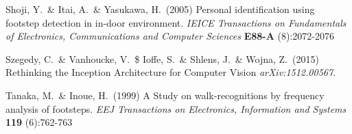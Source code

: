 \documentclass{article}
\begin{document}
Shoji, Y.\ \& Itai, A.\ \& Yasukawa, H.\ (2005) Personal identification using footstep detection in in-door environment. {\it IEICE Transactions on Fundamentals of Electronics, Communications and Computer Sciences} {\bf E88-A} (8):2072-2076

Szegedy, C.\ \& Vanhoucke, V.\ \$ Ioffe, S.\ \& Shlens, J.\ \& Wojna, Z.\ (2015) Rethinking the Inception Architecture for Computer Vision {\it arXiv:1512.00567.}

Tanaka, M.\ \& Inoue, H.\ (1999) A Study on walk-recognitions by frequency analysis of footsteps. {\it EEJ Transactions on Electronics, Information and Systems} {\bf 119} (6):762-763
\end{document}
